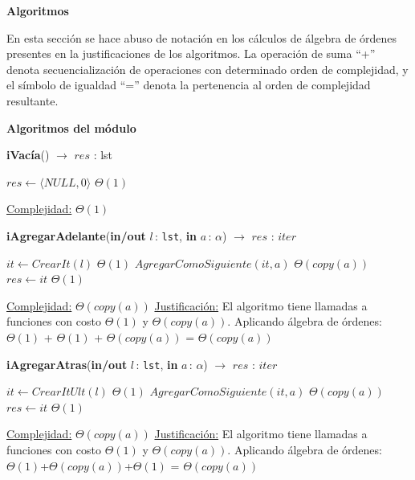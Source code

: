 \documentclass[a4paper,10pt]{article}
\let\TipoVariable=\texttt
\let\ModificadorArgumento=\textbf
\newcommand{\In}[2]{\ModificadorArgumento{in} \ensuremath{#1}\,: \TipoVariable{#2}\xspace}
\newcommand{\Inout}[2]{\ModificadorArgumento{in/out} \ensuremath{#1}\,: \TipoVariable{#2}\xspace}
\newenvironment{Algoritmos}{%
  \vspace*{2ex}%
  \noindent\textbf{\Large Algoritmos}%
  \vspace*{2ex}%
}{}
\newcommand{\Titulo}[1]{
  \vspace*{1ex}\par\noindent\textbf{\large #1}\par
}
\begin{document}
\begin{Algoritmos}

En esta sección se hace abuso de notación en los cálculos de álgebra de órdenes presentes en la justificaciones de los algoritmos. La operación de suma ``+'' denota secuencialización de operaciones con determinado orden de complejidad, y el símbolo de igualdad ``='' denota la pertenencia al orden de complejidad resultante.

\medskip
	
 \Titulo{Algoritmos del módulo}
  	\medskip
  
\begin{algorithm}[H]{\textbf{iVacía}() $\to$ $res$ : lst}
    	\begin{algorithmic}[1]
			 \State $res \gets \langle NULL, 0 \rangle$ \Comment $\Theta(1)$

			\medskip
			\Statex \underline{Complejidad:} $\Theta(1)$
    	\end{algorithmic}
\end{algorithm}

\begin{algorithm}[H]{\textbf{iAgregarAdelante}(\Inout{l}{lst}, \In{a}{$\alpha$}) $\to$ $res$ : $iter$}
	\begin{algorithmic}
			 \State $it \gets CrearIt(l)$ 				\Comment $\Theta(1)$
			 \State $AgregarComoSiguiente(it, a)$	\Comment $\Theta(copy(a))$
			 \State $res \gets it$					\Comment $\Theta(1)$

			\medskip
			\Statex \underline{Complejidad:} $\Theta(copy(a))$
			\Statex \underline{Justificación:} El algoritmo tiene llamadas a funciones con costo $\Theta(1)$ y $\Theta(copy(a))$. Aplicando álgebra de órdenes: \\ $\Theta(1)$ + $\Theta(1)$ + $\Theta(copy(a))$ = $\Theta(copy(a))$
    	\end{algorithmic}
\end{algorithm}


\begin{algorithm}[H]{\textbf{iAgregarAtras}(\Inout{l}{lst}, \In{a}{$\alpha$}) $\to$ $res$ : $iter$}
	\begin{algorithmic}[1]
			 \State $it \gets CrearItUlt(l)$	\Comment $\Theta(1)$
			 \State $AgregarComoSiguiente(it, a)$	\Comment $\Theta(copy(a))$
			 \State $res \gets it$	\Comment $\Theta(1)$

			\medskip
			\Statex \underline{Complejidad:} $\Theta(copy(a))$
			\Statex \underline{Justificación:} El algoritmo tiene llamadas a funciones con costo $\Theta(1)$ y $\Theta(copy(a))$. Aplicando álgebra de órdenes:  $\Theta(1)$+$\Theta(copy(a))$+$\Theta(1)$ =  $\Theta(copy(a))$
    	\end{algorithmic}
\end{algorithm}
	


\end{Algoritmos}
\end{document}
